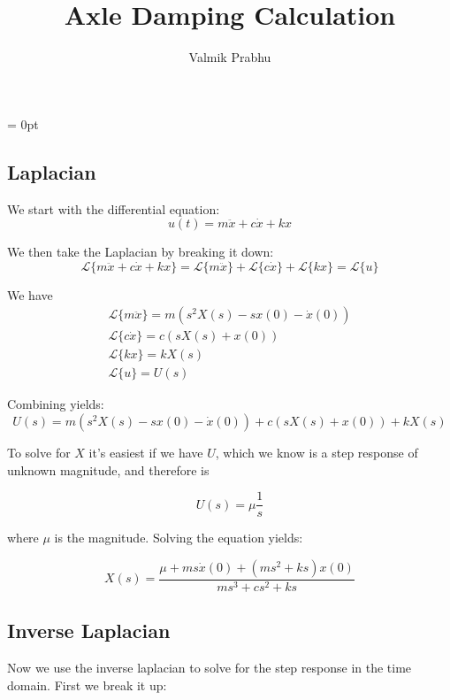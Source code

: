 \documentclass{article}
\title{Axle Damping Calculation}
\author{Valmik Prabhu}
\begin{document}
\maketitle

\parindent = 0pt

\subsection{Laplacian}

We start with the differential equation:
\begin{equation*}
    u(t) = m\ddot{x} + c\dot{x} + kx
\end{equation*}

We then take the Laplacian by breaking it down:
\begin{equation*}
    \mathcal{L}\{m\ddot{x} + c\dot{x} + kx\} = \mathcal{L}\{m\ddot{x}\} + \mathcal{L}\{c \dot{x}\} + \mathcal{L}\{kx\} = \mathcal{L}\{u\}
\end{equation*}

We have
\begin{gather*}
    \mathcal{L}\{m\ddot{x}\} = m(s^2 X(s) - sx(0) - \dot{x}(0)) \\
    \mathcal{L}\{c \dot{x}\} = c(sX(s) + x(0)) \\
    \mathcal{L}\{kx\} = kX(s) \\
    \mathcal{L}\{u\} = U(s)
\end{gather*}

Combining yields:
\begin{equation*}
    U(s) = m(s^2 X(s) - sx(0) - \dot{x}(0)) + c(sX(s) + x(0)) + kX(s)
\end{equation*}

To solve for $X$ it's easiest if we have $U$, which we know is a step response of unknown magnitude, and therefore is

\begin{equation*}
    U(s) = \mu \frac{1}{s}
\end{equation*}

where $\mu$ is the magnitude. Solving the equation yields: 

\begin{equation*}
    X(s) = \frac{\mu + ms\dot{x}(0) + (ms^2 + ks)x(0)}{ms^3 + cs^2 + ks}
\end{equation*}


\subsection{Inverse Laplacian}
Now we use the inverse laplacian to solve for the step response in the time domain. First we break it up:
\end{document}
